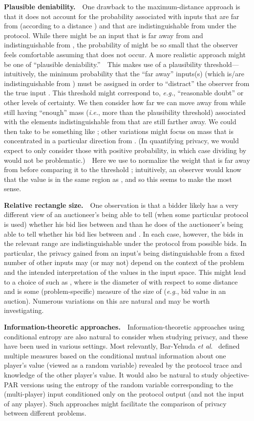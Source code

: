 \documentclass{article}
\theoremstyle{theorem}
\theoremstyle{definition}
\theoremstyle{remark}
\newcommand{\ie}{\emph{i.e.}}
\newcommand{\eg}{\emph{e.g.}}
\newcommand{\etal}{\emph{et al}}
\begin{document}
\textbf{Plausible deniability.}\ \ One drawback to the maximum-distance approach is that it does not account for the probability associated with inputs that are far from  (according to a distance ) and that are indistinguishable from  under the protocol.  While there might be an input  that is far away from  and indistinguishable from , the probability of  might be so small that the observer feels comfortable assuming that  does not occur.  A more realistic approach might be one of ``plausible deniability.''\ \ This makes use of a plausibility threshold---intuitively, the minimum probability that the ``far away'' inputs(s) (which is/are indistinguishable from ) must be assigned in order to ``distract'' the observer from the true input .  This threshold might correspond to, \eg, ``reasonable doubt'' or other levels of certainty.  We then consider how far we can move away from  while still having ``enough'' mass (\ie, more than the plausibility threshold) associated with the elements indistinguishable from  that are still farther away.  We could then take  to be something like ; other variations might focus on mass that is concentrated in a particular direction from .  (In quantifying privacy, we would expect to only consider those  with positive probability, in which case dividing by  would not be problematic.)\ \ Here we use  to normalize the weight that is far away from  before comparing it to the threshold ; intuitively, an observer would know that the value is in the same region as , and so this seems to make the most sense.

\textbf{Relative rectangle size.}\ \ One observation is that a bidder likely has a very different view of an auctioneer's being able to tell (when some particular protocol is used) whether his bid lies between  and  than he does of the auctioneer's being able to tell whether his bid lies between  and .  In each case, however, the bids in the relevant range are indistinguishable under the protocol from  possible bids.  In particular, the privacy gained from an input's being distinguishable from a fixed number of other inputs may (or may not) depend on the context of the problem and the intended interpretation of the values in the input space.  This might lead to a choice of  such as , where  is the diameter of  with respect to some distance  and  is some (problem-specific) measure of the size of  (\eg, bid value in an auction).  Numerous variations on this are natural and may be worth investigating.

\textbf{Information-theoretic approaches.}\ \ Information-the\-oretic approaches using conditional entropy are also natural to consider when studying privacy, and these have been used in various settings.  Most relevantly, Bar-Yehuda \etal.~\cite{BCKO} defined multiple measures based on the conditional mutual information about one player's value (viewed as a random variable) revealed by the protocol trace and knowledge of the other player's value.  It would also be natural to study objective-PAR versions using the entropy of the random variable corresponding to the (multi-player) input conditioned only on the protocol output (and not the input of any player).  Such approaches might facilitate the comparison of privacy between different problems.
\end{document}
